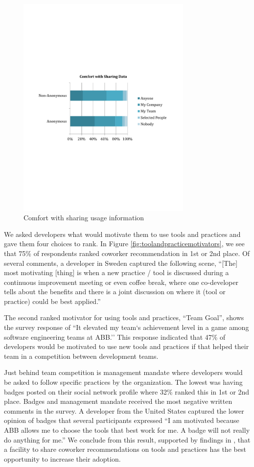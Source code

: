 \documentclass{sig-alternate}
\begin{document}
\begin{figure}
	\includegraphics[width=3.4in]{ComfortWithSharing.pdf}
	\caption{Comfort with sharing usage information}
	\label{fig:comfortwithsharing}
\end{figure}

We asked developers what would motivate them to use tools and practices and gave them four choices to rank.  In Figure \ref{fig:toolandpracticemotivators}, we see that 75\% of respondents ranked coworker recommendation in 1st or 2nd place.  Of several comments, a developer in Sweden captured the following scene, ``[The] most motivating [thing] is when a new practice / tool is discussed during a continuous improvement meeting or even coffee break, where one co-developer tells about the benefits and there is a joint discussion on where it (tool or practice) could be best applied.''  

The second ranked motivator for using tools and practices, ``Team Goal'', shows the survey response of ``It elevated my team`s achievement level in a game among software engineering teams at ABB.''   This response indicated that 47\% of developers would be motivated to use new tools and practices if that helped their team in a competition between development teams.   

Just behind team competition is management mandate where developers would be asked to follow specific practices by the organization.  The lowest was having badges posted on their social network profile where 32\% ranked this in 1st or 2nd place.   Badges and management mandate received the most negative written comments in the survey.  A developer from the United States captured the lower opinion of badges that several participants expressed ``I am motivated because ABB allows me to choose the tools that best work for me. A badge will not really do anything for me.''  We conclude from this result, supported by findings in \cite{MurphyHill2012Improving,wbsnipes:Hill2011Peer}, that a facility to share coworker recommendations on tools and practices has the best opportunity to increase their adoption.  
 
\end{document}
